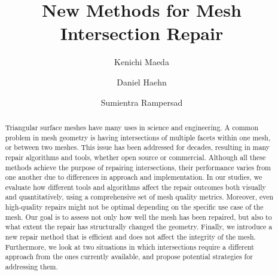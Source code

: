 \documentclass[review,anonymous,acmtog]{acmart}
\begin{document}
\title{New Methods for Mesh Intersection Repair}


\author{Kenichi Maeda}

\author{Daniel Haehn}

\author{Sumientra Rampersad}

\renewcommand{\shortauthors}{Trovato et al.}

\begin{abstract}
  Triangular surface meshes have many uses in science and engineering. A common problem in mesh geometry is having intersections of multiple facets within one mesh, or between two meshes. This issue has been addressed for decades, resulting in many repair algorithms and tools, whether open source or commercial. Although all these methods achieve the purpose of repairing intersections, their performance varies from one another due to differences in approach and implementation. In our studies, we evaluate how different tools and algorithms affect the repair outcomes both visually and quantitatively, using a comprehensive set of mesh quality metrics. Moreover, even high-quality repairs might not be optimal depending on the specific use case of the mesh. Our goal is to assess not only how well the mesh has been repaired, but also to what extent the repair has structurally changed the geometry. Finally, we introduce a new repair method that is efficient and does not affect the integrity of the mesh. Furthermore, we look at two situations in which intersections require a different approach from the ones currently available, and propose potential strategies for addressing them.
\end{abstract}
\end{document}

